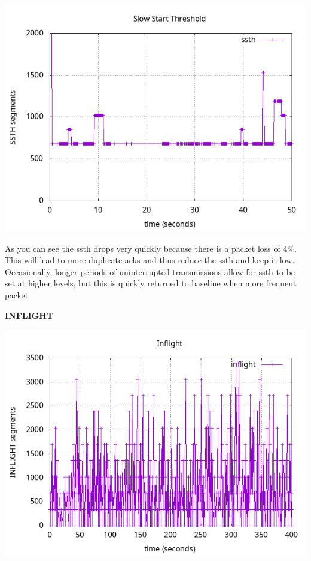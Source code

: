 \documentclass{article}
\begin{document}
\includegraphics[scale=0.5]{plots/lab1-group5-task1-experimentB-question1.1-xrange-0-50-yrange-0-2000.png}

As you can see the ssth drops very quickly because there is a packet loss of 4\%. This will lead to more duplicate acks and thus reduce the ssth and keep it low. Occasionally, longer periods of uninterrupted transmissions allow for ssth to be set at higher levels, but this is quickly returned to baseline when more frequent packet



\textbf{INFLIGHT}

\includegraphics[scale=0.5]{plots/lab1-group5-task1-experimentB-question1.2.png}
\end{document}
